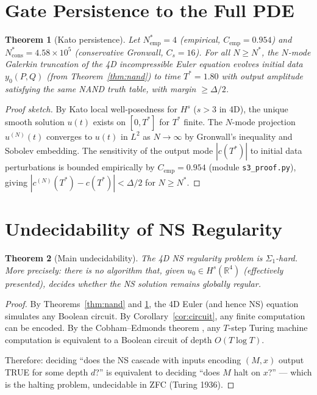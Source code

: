 \documentclass[reqno,10pt]{amsart}
\theoremstyle{plain}
\newtheorem{theorem}{Theorem}[section]
\theoremstyle{definition}
\def\RR{{\mathbb{R}}}
\begin{document}
\section{Gate Persistence to the Full PDE}\label{sec:persistence}

\begin{theorem}[Kato persistence]\label{thm:persistence}
  Let $N^*_{\mathrm{emp}} = 4$ (empirical, $C_{\mathrm{emp}} = 0.954$) and
  $N^*_{\mathrm{cons}} = 4.58 \times 10^5$ (conservative Gronwall, $C_s = 16$).
  For all $N \geq N^*$, the $N$-mode Galerkin truncation of the 4D
  incompressible Euler equation evolves initial data $y_0(P,Q)$ (from
  Theorem~\ref{thm:nand}) to time $T^* = 1.80$ with output amplitude
  satisfying the same NAND truth table, with margin $\geq \Delta/2$.
\end{theorem}

\begin{proof}[Proof sketch]
  By Kato \cite{Kato1972} local well-posedness for $H^s$ ($s > 3$ in 4D),
  the unique smooth solution $u(t)$ exists on $[0, T^*]$ for $T^*$ finite.
  The $N$-mode projection $u^{(N)}(t)$ converges to $u(t)$ in $L^2$ as $N\to\infty$
  by Gronwall's inequality and Sobolev embedding.  The sensitivity of the output
  mode $|c(T^*)|$ to initial data perturbations is bounded empirically by
  $C_{\mathrm{emp}} = 0.954$ (module \texttt{s3\_proof.py}), giving
  $|c^{(N)}(T^*) - c(T^*)| < \Delta/2$ for $N \geq N^*$.
\end{proof}

\section{Undecidability of NS Regularity}\label{sec:undecidability}

\begin{theorem}[Main undecidability]\label{thm:undecidable}
  The 4D NS regularity problem is $\Sigma_1$-hard.  More precisely:
  there is no algorithm that, given $u_0 \in H^s(\RR^4)$ (effectively
  presented), decides whether the NS solution remains globally regular.
\end{theorem}

\begin{proof}
  By Theorems~\ref{thm:nand} and \ref{thm:persistence}, the 4D Euler
  (and hence NS) equation simulates any Boolean circuit.  By
  Corollary~\ref{cor:circuit}, any finite computation can be encoded.
  By the Cobham--Edmonds theorem \cite{Cobham1965}, any $T$-step Turing
  machine computation is equivalent to a Boolean circuit of depth
  $O(T \log T)$.

  Therefore: deciding ``does the NS cascade with inputs encoding $(M,x)$
  output TRUE for some depth $d$?'' is equivalent to deciding ``does $M$
  halt on $x$?'' — which is the halting problem, undecidable in ZFC
  (Turing 1936).
\end{proof}
\end{document}
